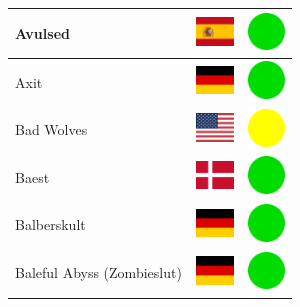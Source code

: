 \documentclass[12pt, a4paper, twoside]{report}
\begin{document}
\begin{center}
\begin{longtable}{|p{5cm}|p{2cm}|p{2cm}|}
 Avulsed                                                    & \includegraphics[width=1cm]{../4x3/es} &   \includegraphics[width=1cm]{../likes/y} \\ \hline
 Axit                                                       & \includegraphics[width=1cm]{../4x3/de} &   \includegraphics[width=1cm]{../likes/y} \\ \hline
 Bad Wolves                                                 & \includegraphics[width=1cm]{../4x3/us} &   \includegraphics[width=1cm]{../likes/m} \\ \hline
 Baest                                                      & \includegraphics[width=1cm]{../4x3/dk} &   \includegraphics[width=1cm]{../likes/y} \\ \hline
 Balberskult                                                & \includegraphics[width=1cm]{../4x3/de} &   \includegraphics[width=1cm]{../likes/y} \\ \hline
 Baleful Abyss (Zombieslut)                                 & \includegraphics[width=1cm]{../4x3/de} &   \includegraphics[width=1cm]{../likes/y} \\ \hline

\end{longtable}
\end{center}
\end{document}
